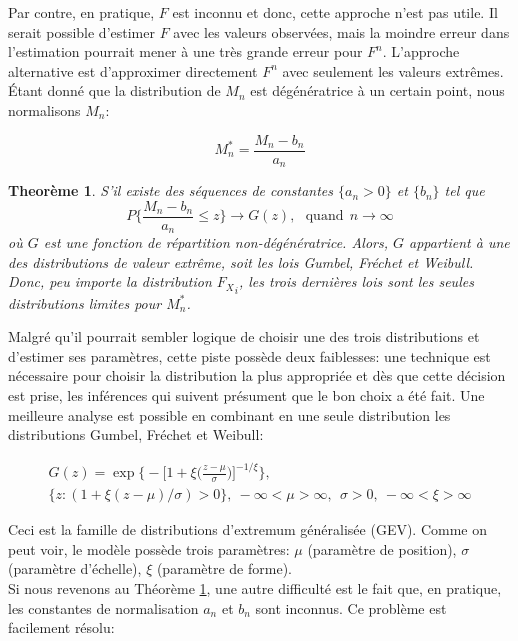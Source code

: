\documentclass[11pt]{report}
\newtheorem{theorem}{Theorème}[chapter]
\numberwithin{equation}{section}
\begin{document}
Par contre, en pratique, $F$ est inconnu et donc, cette approche n'est pas utile. Il serait possible d'estimer $F$ avec les valeurs observées, mais la moindre erreur dans l'estimation pourrait mener à une très grande erreur pour $F^n$. L'approche alternative est d'approximer directement $F^n$ avec seulement les valeurs extrêmes. Étant donné que la distribution de $M_n$ est dégénératrice à un certain point, nous normalisons $M_n$: 

\begin{equation}\label{eq:1.1.2}
M^*_n = \frac{M_n - b_n}{a_n}
\end{equation}

\begin{theorem}\label{theor:1.1}
S'il existe des séquences de constantes $\{a_n > 0\}$ et $\{b_n\}$ tel que $$P\Bigg\{\frac{M_n - b_n}{a_n} \le z \Bigg\}\to G(z), \ \ \  \text{quand} \ \ {n \to \infty}$$ où $G$ est une fonction de répartition non-dégénératrice. Alors, $G$ appartient à une des distributions de valeur extrême, soit les lois Gumbel, Fréchet et Weibull. Donc, peu importe la distribution ${F_X}_i$, les trois dernières lois sont les seules distributions limites pour $M^*_n$.
\end{theorem}

Malgré qu'il pourrait sembler logique de choisir une des trois distributions et d'estimer ses paramètres, cette piste possède deux faiblesses: une technique est nécessaire pour choisir la distribution la plus appropriée et dès que cette décision est prise, les inférences qui suivent présument que le bon choix a été fait. Une meilleure analyse est possible en combinant en une seule distribution les distributions Gumbel, Fréchet et Weibull:

\begin{equation}\label{eq:1.1.3}
\begin{gathered}
G(z) = \exp \Bigg\{ - \Big[ 1 +\xi\Big(\frac{z-\mu}{\sigma}\Big) \Big]^{-1/\xi}  \Bigg\}, \\
\{z: (1 + \xi(z- \mu)/\sigma) >0\},\ -\infty<\mu>\infty,\ \  \sigma>0,\ -\infty<\xi>\infty
\end{gathered}
\end{equation}

Ceci est la famille de distributions d'extremum généralisée (GEV). Comme on peut voir, le modèle possède trois paramètres: $\mu$ (paramètre de position), $\sigma$ (paramètre d'échelle), $\xi$ (paramètre de forme).\\

Si nous revenons au Théorème \ref{theor:1.1}, une autre difficulté est le fait que, en pratique, les constantes de normalisation $a_n$ et $b_n$ sont inconnus. Ce problème est facilement résolu: 
\end{document}

